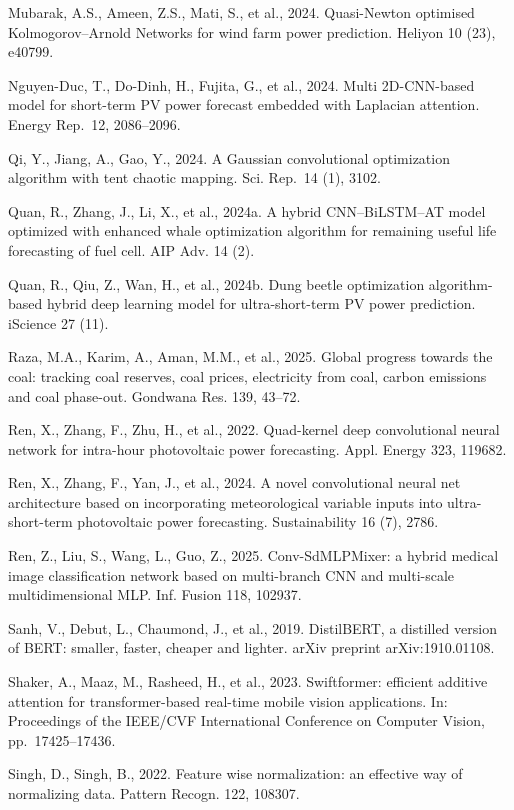 \documentclass[
  10
]{article}
\begin{document}
Mubarak, A.S., Ameen, Z.S., Mati, S., et al., 2024. Quasi-Newton
optimised Kolmogorov--Arnold Networks for wind farm power prediction.
Heliyon 10 (23), e40799.

Nguyen-Duc, T., Do-Dinh, H., Fujita, G., et al., 2024. Multi
2D-CNN-based model for short-term PV power forecast embedded with
Laplacian attention. Energy Rep.~12, 2086--2096.

Qi, Y., Jiang, A., Gao, Y., 2024. A Gaussian convolutional optimization
algorithm with tent chaotic mapping. Sci. Rep.~14 (1), 3102.

Quan, R., Zhang, J., Li, X., et al., 2024a. A hybrid CNN--BiLSTM--AT
model optimized with enhanced whale optimization algorithm for remaining
useful life forecasting of fuel cell. AIP Adv. 14 (2).

Quan, R., Qiu, Z., Wan, H., et al., 2024b. Dung beetle optimization
algorithm-based hybrid deep learning model for ultra-short-term PV power
prediction. iScience 27 (11).

Raza, M.A., Karim, A., Aman, M.M., et al., 2025. Global progress towards
the coal: tracking coal reserves, coal prices, electricity from coal,
carbon emissions and coal phase-out. Gondwana Res. 139, 43--72.

Ren, X., Zhang, F., Zhu, H., et al., 2022. Quad-kernel deep
convolutional neural network for intra-hour photovoltaic power
forecasting. Appl. Energy 323, 119682.

Ren, X., Zhang, F., Yan, J., et al., 2024. A novel convolutional neural
net architecture based on incorporating meteorological variable inputs
into ultra-short-term photovoltaic power forecasting. Sustainability 16
(7), 2786.

Ren, Z., Liu, S., Wang, L., Guo, Z., 2025. Conv-SdMLPMixer: a hybrid
medical image classification network based on multi-branch CNN and
multi-scale multidimensional MLP. Inf. Fusion 118, 102937.

Sanh, V., Debut, L., Chaumond, J., et al., 2019. DistilBERT, a distilled
version of BERT: smaller, faster, cheaper and lighter. arXiv preprint
arXiv:1910.01108.

Shaker, A., Maaz, M., Rasheed, H., et al., 2023. Swiftformer: efficient
additive attention for transformer-based real-time mobile vision
applications. In: Proceedings of the IEEE/CVF International Conference
on Computer Vision, pp.~17425--17436.

Singh, D., Singh, B., 2022. Feature wise normalization: an effective way
of normalizing data. Pattern Recogn. 122, 108307.
\end{document}
